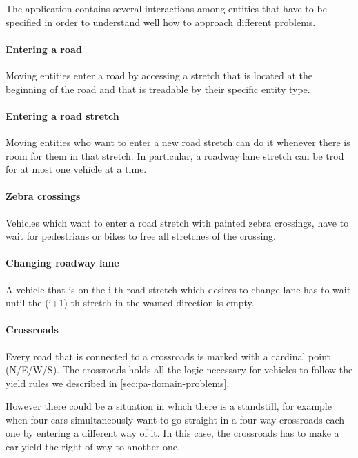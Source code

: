 
The application contains several interactions among entities that have to be
specified in order to understand well how to approach different problems.

\paragraph{Entering a road} Moving entities enter a road by accessing a stretch
that is located at the beginning of the road and that is treadable by their
specific entity type.

\paragraph{Entering a road stretch} 
Moving entities who want to enter a new road stretch
can do it whenever there is room for them in that stretch. 
In particular, a roadway lane stretch can be trod for at most 
one vehicle at a time.

\paragraph{Zebra crossings} Vehicles which want to enter a road stretch 
with painted zebra crossings, have to wait for 
pedestrians or bikes to free all stretches of the crossing.

\paragraph{Changing roadway lane} A vehicle that is on the i-th road stretch
which desires to change lane has to wait until the (i+1)-th stretch in the
wanted direction is empty.

\paragraph{Crossroads} Every road that is connected to a crossroads is marked
with a cardinal point (N/E/W/S). The crossroads holds all the logic necessary
for vehicles to follow the yield rules we described in
\ref{sec:pa-domain-problems}.

However there could be a situation in which there is a standstill,
for example when four cars simultaneously want to go straight in
a four-way crossroads each one by entering a different way of it.
In this case, the crossroads has to make a car yield the right-of-way to another one.


